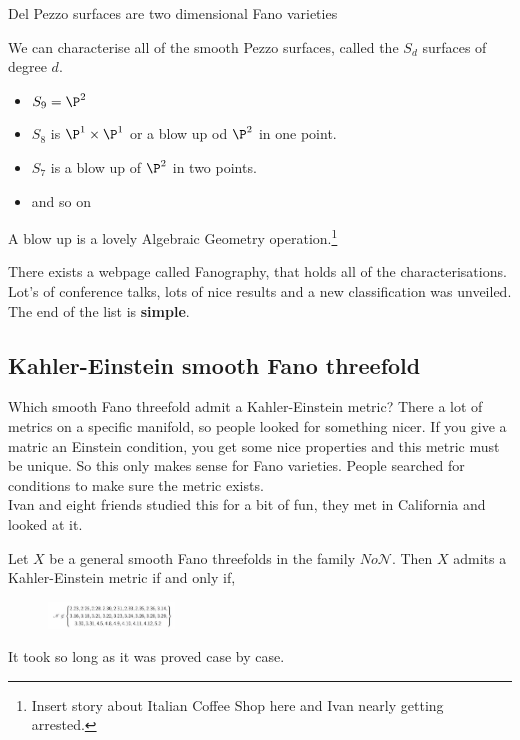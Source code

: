 \documentclass{article}
\begin{document}
\begin{ndefi}
  Del Pezzo surfaces are two dimensional Fano varieties
\end{ndefi}
We can characterise all of the smooth Pezzo surfaces, called the $S_d$ surfaces of degree $d$.

\begin{itemize}
  \item $S_9 = \P^2$
  \item $S_8$ is $\P^1 \times \P^1$ or a blow up od $\P^2$ in one point.
  \item $S_7$ is a blow up of $\P^2$ in two points.
  \item and so on
\end{itemize}
A blow up is a lovely Algebraic Geometry operation.\footnote{Insert story about Italian Coffee Shop here and Ivan nearly getting arrested.}

There exists a webpage called Fanography, that holds all of the characterisations. Lot's of conference talks, lots of nice results and a new classification was unveiled. The end of the list is \textbf{simple}.

\subsection{Kahler-Einstein smooth Fano threefold}
Which smooth Fano threefold admit a Kahler-Einstein metric? There a lot of metrics on a specific manifold, so people looked for something nicer. If you give a matric an Einstein condition, you get some nice properties and this metric must be unique. So this only makes sense for Fano varieties. People searched for conditions to make sure the metric exists. \\

Ivan and eight friends studied this for a bit of fun, they met in California and looked at it.

\begin{nthm}[]
  Let $X$ be a general smooth Fano threefolds in the family $No\mathcal{N}$. Then $X$ admits a Kahler-Einstein metric if and only if,
  \begin{figure}[!ht]
  \centering
  \includegraphics[width=0.3\textwidth]{./figures/L4.4}
  \end{figure}
\end{nthm}
It took so long as it was proved case by case.
\end{document}
